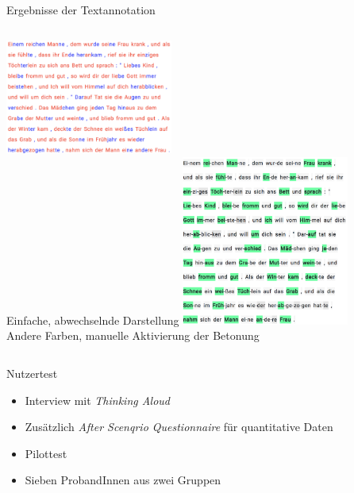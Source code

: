 \documentclass{beamer}
\begin{document}
\begin{frame}{Ergebnisse der Textannotation}
\begin{columns}[t]
	\centering
	\includegraphics[width=5.5cm]{../figures/evaluation/pre-annotation1}\\
	[0.5cm]
	Einfache, abwechselnde Darstellung
	\centering
	\includegraphics[width=5.5cm]{../figures/evaluation/pre-annotation3}\\
	[0.5cm]
	Andere Farben, manuelle Aktivierung der Betonung
\end{columns}
\end{frame}

\begin{frame}{Nutzertest}
\begin{itemize}
	\item Interview mit \textit{Thinking Aloud}
	\item Zusätzlich \textit{After Scenqrio Questionnaire} für quantitative Daten
	\item Pilottest
	\item Sieben ProbandInnen aus zwei Gruppen
\end{itemize}
\end{frame}
\end{document}
